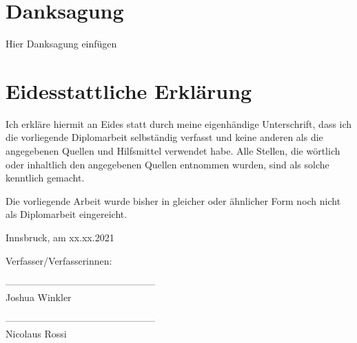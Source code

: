 \section*{Danksagung}

Hier Danksagung einfügen

\section*{Eidesstattliche Erklärung}

Ich erkläre hiermit an Eides statt durch meine eigenhändige Unterschrift, dass ich die vorliegende Diplomarbeit selbständig verfasst und keine anderen als die angegebenen Quellen und Hilfsmittel verwendet habe. Alle Stellen, die wörtlich oder inhaltlich den angegebenen Quellen entnommen wurden, sind als solche kenntlich gemacht.

Die vorliegende Arbeit wurde bisher in gleicher oder ähnlicher Form noch nicht als Diplomarbeit eingereicht.

Innsbruck, am xx.xx.2021

\vspace*{3cm}



Verfasser/Verfasserinnen:

\vspace*{2cm}


-----------------------------------------------\\
\hspace*{1.3cm}           Joshua Winkler

\vspace*{2cm}


-----------------------------------------------\\
\hspace*{1.3cm}           Nicolaus Rossi



\newpage